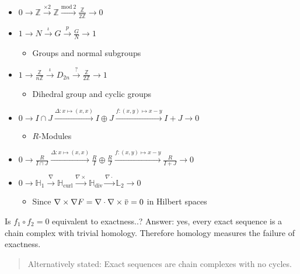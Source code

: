 \begin{itemize}
\tightlist
\item
  \(0 \to{\mathbb{Z}}\xrightarrow{\times 2} {\mathbb{Z}}\xrightarrow{\text{mod}~2} \frac{{\mathbb{Z}}}{2{\mathbb{Z}}} \to 0\)
\item
  \(1 \to N \xrightarrow{\iota} G \xrightarrow{p} \frac{G}{N} \to 1\)

  \begin{itemize}
  \tightlist
  \item
    Groups and normal subgroups
  \end{itemize}
\item
  \(1 \to\frac{{\mathbb{Z}}}{n{\mathbb{Z}}} \xrightarrow{\iota} D_{2n} \xrightarrow{?} \frac{{\mathbb{Z}}}{2{\mathbb{Z}}} \to 1\)

  \begin{itemize}
  \tightlist
  \item
    Dihedral group and cyclic groups
  \end{itemize}
\item
  \(0 \to I \cap J \xrightarrow{\Delta: x\mapsto(x,x)} I \oplus J \xrightarrow{f:(x,y) \mapsto x-y} I + J \to 0\)

  \begin{itemize}
  \tightlist
  \item
    \(R\)-Modules
  \end{itemize}
\item
  \(0 \to\frac{R}{I \cap J} \xrightarrow{\Delta: x\mapsto(x,x)} \frac{R}{I} \oplus \frac{R}{J} \xrightarrow{f:(x,y) \mapsto x-y} \frac{R}{I + J} \to 0\)
\item
  \(0 \to\mathbb{H}_1 \xrightarrow{\nabla} \mathbb{H}_\text{curl} \xrightarrow{\nabla \times} \mathbb{H}_\text{div} \xrightarrow{\nabla \cdot} \mathbb{L}_2 \to 0\)

  \begin{itemize}
  \tightlist
  \item
    Since
    \(\nabla \times\nabla F = \nabla \cdot\nabla\times\mkern 1.5mu\overline{\mkern-1.5muv\mkern-1.5mu}\mkern 1.5mu = 0\)
    in Hilbert spaces
  \end{itemize}
\end{itemize}

\begin{remark}

Is \(f_1\circ f_2 = 0\) equivalent to exactness..? Answer: yes, every
exact sequence is a chain complex with trivial homology. Therefore
homology measures the failure of exactness.

\begin{quote}
Alternatively stated: Exact sequences are chain complexes with no
cycles.
\end{quote}

\end{remark}

